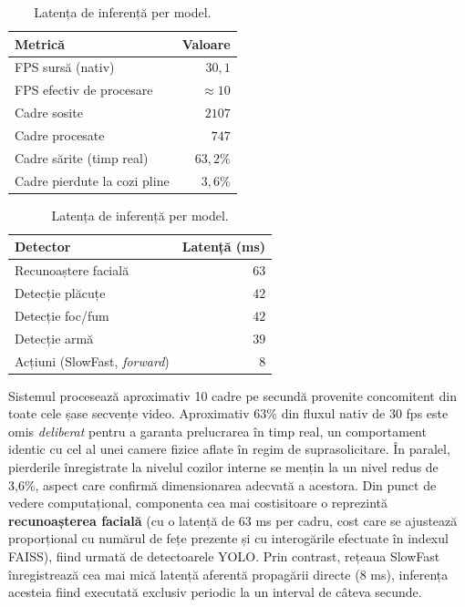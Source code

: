\documentclass[../../main.tex]{subfiles}
\begin{document}
\begin{table}[h]
    \centering
    \begin{minipage}{0.48\textwidth}
        \centering
        \caption{Debitul de procesare sub încărcare.}
        \label{tab:sistem_throughput}
        \setlength{\tabcolsep}{3pt}
        \begin{tabular}{@{}l r@{}}
            \hline
            \textbf{Metrică} & \textbf{Valoare} \\
            \hline
            FPS sursă (nativ)            & $30{,}1$ \\
            FPS efectiv de procesare     & $\approx 10$ \\
            Cadre sosite                 & $2107$ \\
            Cadre procesate              & $747$ \\
            Cadre sărite (timp real)     & $63{,}2\%$ \\
            Cadre pierdute la cozi pline & $3{,}6\%$ \\
            \hline
        \end{tabular}
    \end{minipage}\hfill
    \begin{minipage}{0.48\textwidth}
        \centering
        \caption{Latența de inferență per model.}
        \label{tab:sistem_latenta}
        \setlength{\tabcolsep}{-12pt}
        \begin{tabular}{@{}l r@{}}
            \hline
            \textbf{Detector} & \textbf{Latență (ms)} \\
            \hline
            Recunoaștere facială         & $63$ \\
            Detecție plăcuțe             & $42$ \\
            Detecție foc/fum             & $42$ \\
            Detecție armă                & $39$ \\
            Acțiuni (SlowFast, \textit{forward}) & $8$ \\
            \hline
        \end{tabular}
    \end{minipage}
\end{table}

Sistemul procesează aproximativ 10 cadre pe secundă provenite concomitent din toate cele șase secvențe video. Aproximativ 63\% din fluxul nativ de 30 fps este omis \textit{deliberat} pentru a garanta prelucrarea în timp real, un comportament identic cu cel al unei camere fizice aflate în regim de suprasolicitare. În paralel, pierderile înregistrate la nivelul cozilor interne se mențin la un nivel redus de 3,6\%, aspect care confirmă dimensionarea adecvată a acestora. Din punct de vedere computațional, componenta cea mai costisitoare o reprezintă \textbf{recunoașterea facială} (cu o latență de 63 ms per cadru, cost care se ajustează proporțional cu numărul de fețe prezente și cu interogările efectuate în indexul FAISS), fiind urmată de detectoarele YOLO. Prin contrast, rețeaua SlowFast înregistrează cea mai mică latență aferentă propagării directe (8 ms), inferența acesteia fiind executată exclusiv periodic la un interval de câteva secunde.
\end{document}
